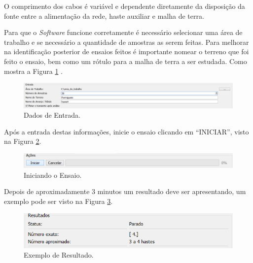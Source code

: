 \documentclass[a4paper, 10pt]{article}
\begin{document}
O comprimento dos cabos é variável e dependente diretamente da disposição da fonte
entre a alimentação da rede, haste auxiliar e malha de terra.

Para que o \textit{Software} funcione corretamente é necessário selecionar uma 
área de trabalho e se necessário a quantidade de amostras as serem feitas. 
Para melhorar na identificação posterior de ensaios feitos é importante nomear 
o terreno que foi feito o ensaio, bem como um rótulo para a malha de terra a ser 
estudada. Como mostra a Figura \ref{fig_entrando_os_dados} .

\begin{figure}[H]
        \caption{\label{fig_entrando_os_dados}Dados de Entrada.}
	    \begin{center}
            \includegraphics[scale=0.4]{../fotos/execucao/selecionando_area_trabalho_2.png}
	    \end{center}
\end{figure}

Após a entrada destas informações, inicie o ensaio clicando em ``INICIAR'', visto
na Figura \ref{fig_iniciando_ensaio}.

\begin{figure}[H]
        \caption{\label{fig_iniciando_ensaio}Iniciando o Ensaio.}
	    \begin{center}
            \includegraphics[scale=0.4]{../fotos/execucao/iniciando_amostragem.png}
	    \end{center}
\end{figure}

Depois de aproximadamente 3 minutos um resultado deve ser apresentando, um exemplo
pode ser visto na Figura \ref{fig_ex_resultado}.

\begin{figure}[H]
        \caption{\label{fig_ex_resultado}Exemplo de Resultado.}
	    \begin{center}
            \includegraphics[scale=0.4]{../fotos/execucao/resultados.png}
	    \end{center}
\end{figure}
\end{document}
